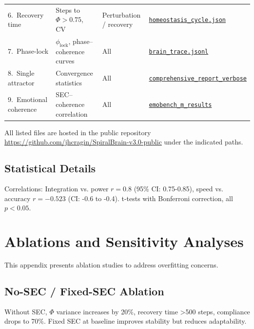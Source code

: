 \documentclass[11pt,a4paper]{article}
\begin{document}
\begin{table}[H]
{\begin{tabular}{L{3cm} L{3cm} L{3cm} L{6cm}}
6.\ Recovery time
  & Steps to $\Phi > 0.75$, CV
  & Perturbation / recovery
  & \href{https://github.com/jhcragin/SpiralBrain-v3.0-public/blob/main/ELASTIC_COGNITION_SPIRAL_ARCHITECTURE/results/homeostasis_cycle.json}
         {\texttt{homeostasis\_cycle.json}} \\

7.\ Phase-lock
  & $\phi_{\text{lock}}$, phase–coherence curves
  & All
  & \href{https://github.com/jhcragin/SpiralBrain-v3.0-public/blob/main/ELASTIC_COGNITION_SPIRAL_ARCHITECTURE/results/brain_trace.jsonl}
         {\texttt{brain\_trace.jsonl}} \\

8.\ Single attractor
  & Convergence statistics
  & All
  & \href{https://github.com/jhcragin/SpiralBrain-v3.0-public/blob/main/ELASTIC_COGNITION_SPIRAL_ARCHITECTURE/results/comprehensive_report_verbose_20251125_213442.json}
         {\texttt{comprehensive\_report\_verbose}} \\

9.\ Emotional coherence
  & SEC–coherence correlation
  & All
  & \href{https://github.com/jhcragin/SpiralBrain-v3.0-public/blob/main/ELASTIC_COGNITION_SPIRAL_ARCHITECTURE/results/emobench_m_results.json}
         {\texttt{emobench\_m\_results}} \\
\bottomrule
\end{tabular}
}
\end{table}

All listed files are hosted in the public repository
\url{https://github.com/jhcragin/SpiralBrain-v3.0-public} under the indicated paths.

\subsection{Statistical Details}

Correlations: Integration vs. power \(r = 0.8\) (95\% CI: 0.75-0.85), speed vs. accuracy \(r = -0.523\) (CI: -0.6 to -0.4). t-tests with Bonferroni correction, all \(p < 0.05\).

\section{Ablations and Sensitivity Analyses}
\label{app:ablations}

This appendix presents ablation studies to address overfitting concerns.

\subsection{No-SEC / Fixed-SEC Ablation}
Without SEC, \(\Phi\) variance increases by 20\%, recovery time >500 steps, compliance drops to 70\%. Fixed SEC at baseline improves stability but reduces adaptability.
\end{document}
